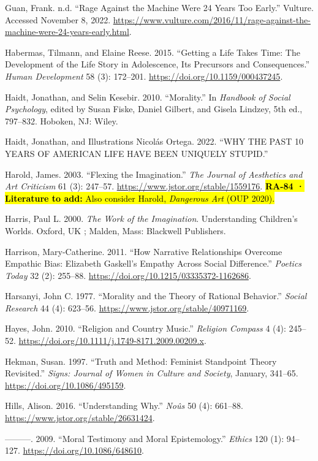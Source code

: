 \documentclass[
  letterpaper,
  DIV=11,
  numbers=noendperiod]{scrartcl}
\theoremstyle{remark}
\begin{document}
Guan, Frank. n.d. ``Rage Against the Machine Were 24 Years Too Early.''
Vulture. Accessed November 8, 2022.
\url{https://www.vulture.com/2016/11/rage-against-the-machine-were-24-years-early.html}.

Habermas, Tilmann, and Elaine Reese. 2015. ``Getting a Life Takes Time:
The Development of the Life Story in Adolescence, Its Precursors and
Consequences.'' \emph{Human Development} 58 (3): 172--201.
\url{https://doi.org/10.1159/000437245}.

Haidt, Jonathan, and Selin Kesebir. 2010. ``Morality.'' In
\emph{Handbook of Social Psychology}, edited by Susan Fiske, Daniel
Gilbert, and Gisela Lindzey, 5th ed., 797--832. Hoboken, NJ: Wiley.

Haidt, Jonathan, and Illustrations Nicolás Ortega. 2022. ``WHY THE PAST
10 YEARS OF AMERICAN LIFE HAVE BEEN UNIQUELY STUPID.''

Harold, James. 2003. ``Flexing the Imagination.'' \emph{The Journal of
Aesthetics and Art Criticism} 61 (3): 247--57.
\url{https://www.jstor.org/stable/1559176}. \hl{\textbf{RA-84 ·
Literature to add:} Also consider Harold, \emph{Dangerous Art} (OUP
2020).}

Harris, Paul L. 2000. \emph{The Work of the Imagination}. Understanding
Children's Worlds. Oxford, UK ; Malden, Mass: Blackwell Publishers.

Harrison, Mary-Catherine. 2011. ``How Narrative Relationships Overcome
Empathic Bias: Elizabeth Gaskell's Empathy Across Social Difference.''
\emph{Poetics Today} 32 (2): 255--88.
\url{https://doi.org/10.1215/03335372-1162686}.

Harsanyi, John C. 1977. ``Morality and the Theory of Rational
Behavior.'' \emph{Social Research} 44 (4): 623--56.
\url{https://www.jstor.org/stable/40971169}.

Hayes, John. 2010. ``Religion and Country Music.'' \emph{Religion
Compass} 4 (4): 245--52.
\url{https://doi.org/10.1111/j.1749-8171.2009.00209.x}.

Hekman, Susan. 1997. ``Truth and Method: Feminist Standpoint Theory
Revisited.'' \emph{Signs: Journal of Women in Culture and Society},
January, 341--65. \url{https://doi.org/10.1086/495159}.

Hills, Alison. 2016. ``Understanding Why.'' \emph{Noûs} 50 (4): 661--88.
\url{https://www.jstor.org/stable/26631424}.

---------. 2009. ``Moral Testimony and Moral Epistemology.''
\emph{Ethics} 120 (1): 94--127. \url{https://doi.org/10.1086/648610}.
\end{document}

